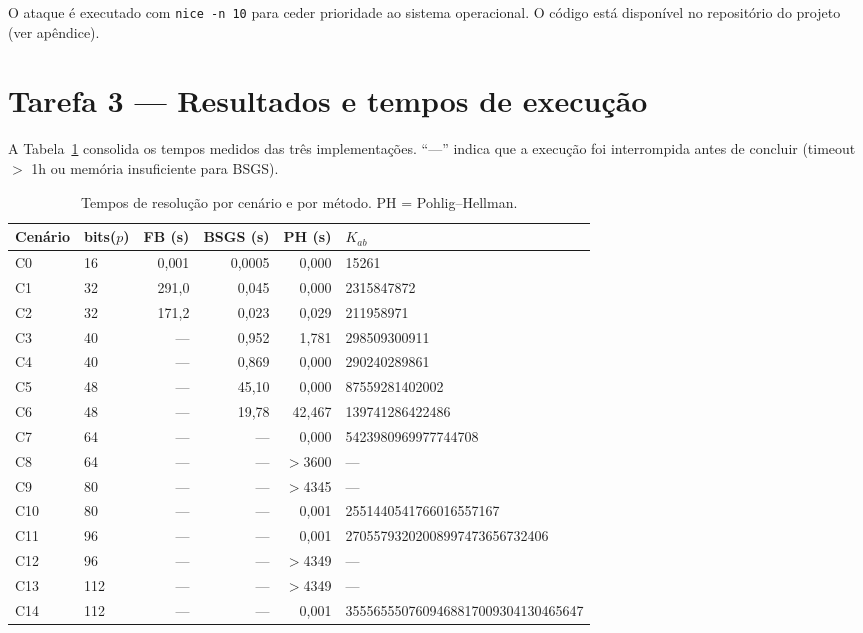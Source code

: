 \documentclass[conference, onecolumn]{IEEEtran}
\begin{document}
O ataque é executado com \texttt{nice -n 10} para ceder prioridade ao sistema operacional.
O código está disponível no repositório do projeto (ver apêndice).

\section{Tarefa 3 — Resultados e tempos de execução}

A Tabela~\ref{tab:tempos} consolida os tempos medidos das três implementações.
``---'' indica que a execução foi interrompida antes de concluir (timeout $>$ 1h ou
memória insuficiente para BSGS).

\begin{table}[H]
\centering
\caption{Tempos de resolução por cenário e por método. PH = Pohlig--Hellman.}
\label{tab:tempos}
\begin{tabular}{@{}llrrrl@{}}
\toprule
\textbf{Cenário} & \textbf{bits($p$)} & \textbf{FB (s)} & \textbf{BSGS (s)} & \textbf{PH (s)} & \textbf{$K_{ab}$} \\
\midrule
C0  & 16  & 0{,}001   & 0{,}0005  & 0{,}000  & 15261 \\
C1  & 32  & 291{,}0   & 0{,}045   & 0{,}000  & 2315847872 \\
C2  & 32  & 171{,}2   & 0{,}023   & 0{,}029  & 211958971 \\
C3  & 40  & ---       & 0{,}952   & 1{,}781  & 298509300911 \\
C4  & 40  & ---       & 0{,}869   & 0{,}000  & 290240289861 \\
C5  & 48  & ---       & 45{,}10   & 0{,}000  & 87559281402002 \\
C6  & 48  & ---       & 19{,}78   & 42{,}467 & 139741286422486 \\
C7  & 64  & ---       & ---       & 0{,}000  & 5423980969977744708 \\
C8  & 64  & ---       & ---       & $>$3600  & --- \\
C9  & 80  & ---       & ---       & $>$4345  & --- \\
C10 & 80  & ---       & ---       & 0{,}001  & 2551440541766016557167 \\
C11 & 96  & ---       & ---       & 0{,}001  & 27055793202008997473656732406 \\
C12 & 96  & ---       & ---       & $>$4349  & --- \\
C13 & 112 & ---       & ---       & $>$4349  & --- \\
C14 & 112 & ---       & ---       & 0{,}001  & 3555655507609468817009304130465647 \\

\end{tabular}
\end{table}
\end{document}
